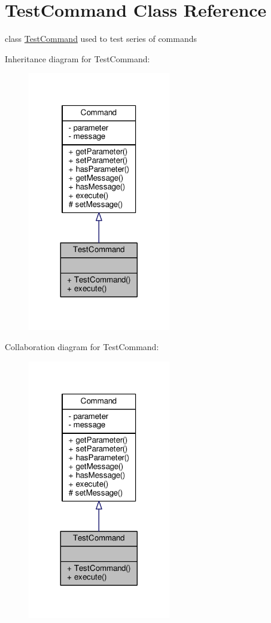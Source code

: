 \hypertarget{classTestCommand}{\section{Test\-Command Class Reference}
\label{classTestCommand}
}


class \hyperlink{classTestCommand}{Test\-Command} used to test series of commands  




Inheritance diagram for Test\-Command\-:
\nopagebreak
\begin{figure}[H]
\begin{center}
\leavevmode
\includegraphics[width=176pt]{classTestCommand__inherit__graph}
\end{center}
\end{figure}


Collaboration diagram for Test\-Command\-:
\nopagebreak
\begin{figure}[H]
\begin{center}
\leavevmode
\includegraphics[width=176pt]{classTestCommand__coll__graph}
\end{center}
\end{figure}
